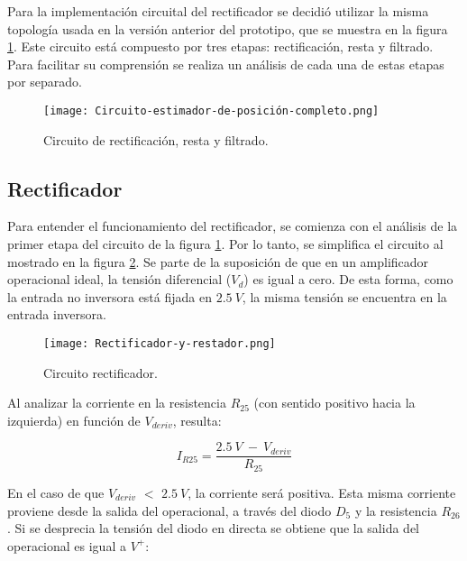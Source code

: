 Para la implementación circuital del rectificador se decidió utilizar la misma topología usada en la versión anterior del prototipo, que se muestra en la figura \ref{fig:img_Circuito_estimador_de_posición_completo}. Este circuito está compuesto por tres etapas: rectificación, resta y filtrado. Para facilitar su comprensión se realiza un análisis de cada una de estas etapas por separado.

\begin{figure}[H]
	\centering
	\texttt{[image: Circuito-estimador-de-posición-completo.png]}
	\caption{Circuito de rectificación, resta y filtrado.}
	\label{fig:img_Circuito_estimador_de_posición_completo}
\end{figure}

\subsection{Rectificador}

Para entender el funcionamiento del rectificador, se comienza con el análisis de la primer etapa del circuito de la figura \ref{fig:img_Circuito_estimador_de_posición_completo}. Por lo tanto, se simplifica el circuito al mostrado en la figura \ref{fig:img_Rectificador_y_restador}. Se parte de la suposición de que en un amplificador operacional ideal, la tensión diferencial ($V_d$) es igual a cero. De esta forma, como la entrada no inversora está fijada en $2.5\:V$, la misma tensión se encuentra en la entrada inversora.


\begin{figure}[H]
	\centering
	\texttt{[image: Rectificador-y-restador.png]}
	\caption{Circuito rectificador.}
	\label{fig:img_Rectificador_y_restador}
\end{figure}

Al analizar la corriente en la resistencia $R_{25}$ (con sentido positivo hacia la izquierda) en función de $V_{deriv}$, resulta:

\begin{equation} \label{eq_corriente_r25}
	I_{R25}=\frac{2.5\:V\ -\ V_{deriv}}{R_{25}}
\end{equation}

En el caso de que $V_{deriv}$ $\mathrm{<}$ $2.5\:V$, la corriente será positiva. Esta misma corriente proviene desde la salida del operacional, a través del diodo $D_5$ y la resistencia $R_{26}$. Si se desprecia la tensión del diodo en directa se obtiene que la salida del operacional es igual a $V^+$:

